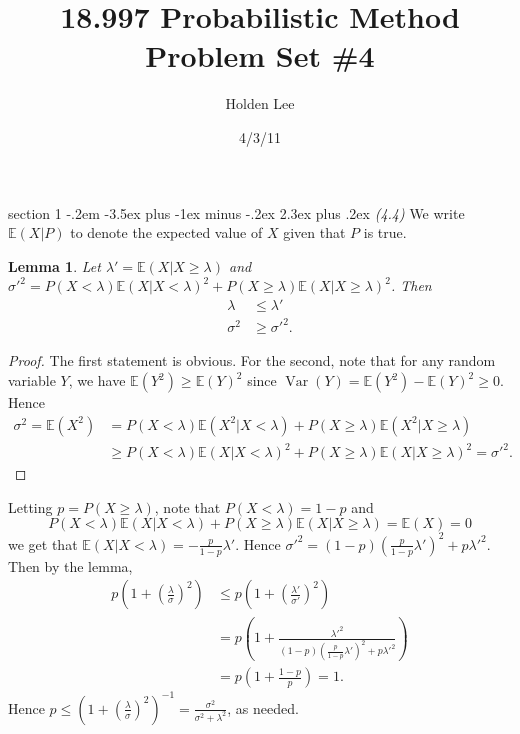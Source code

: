 \documentclass[12pt]{article}
\makeatletter
\theoremstyle{norm}
\newtheorem{lem}[thm]{Lemma}
\newcommand{\E}[0]{\mathbb{E}}
\newcommand{\la}[0]{\lambda}
\newcommand{\si}[0]{\sigma}
\newcommand{\pa}[1]{\left( {#1} \right)}
\newcommand{\Var}{\operatorname{Var}}
\newcommand{\pf}[2]{\pa{\frac{#1}{#2}}}
\newenvironment{problem}{\@startsection
       {section}
       {1}
       {-.2em}
       {-3.5ex plus -1ex minus -.2ex}
       {2.3ex plus .2ex}
       {\pagebreak[3]%
       \large\bf\noindent{Problem }
       }
       }
       {%
       }
\makeatother
\begin{document}
\title{18.997 Probabilistic Method Problem Set \#4}%
\author{Holden Lee}
\date{4/3/11}%
\maketitle
\thispagestyle{empty}

\begin{problem}{\it (4.4)}
We write $\E(X|P)$ to denote the expected value of $X$ given that $P$ is true. 
\begin{lem}
Let $\la'=\E(X|X\ge \la)$ and $\si'^2=P(X<\la)\E(X|X<\la)^2+P(X\ge \la)\E(X|X\ge \la)^2$. Then
\begin{align*}
\la&\le \la'\\
\si^2&\ge \si'^2.
\end{align*}
\end{lem}
\begin{proof}
The first statement is obvious. For the second, note that for any random variable $Y$, we have $\E(Y^2)\ge \E(Y)^2$ since $\Var(Y)=\E(Y^2)-\E(Y)^2\ge 0$. Hence
\begin{align*}
\si^2=\E(X^2)&= P(X<\la)\E(X^2|X<\la)+P(X\ge \la)\E(X^2|X\ge \la)\\
&\ge P(X<\la)\E(X|X<\la)^2+P(X\ge \la)\E(X|X\ge \la)^2=\si'^2.
\end{align*}
\end{proof}
Letting $p=P(X\ge \la)$, note that $P(X<\la)=1-p$ and
\[
P(X<\la)\E(X|X<\la)+P(X\ge \la)\E(X|X\ge \la)=\E(X)=0
\]
we get that $\E(X|X<\la)=-\frac{p}{1-p}\la'$. Hence $\si'^2=(1-p)\pa{\frac p{1-p}\la'}^2+p\la'^2$. Then by the lemma,
\begin{align*}
p\pa{1+\pf{\la}{\si}^2}&
\le p\pa{1+\pf{\la'}{\si'}^2}\\
&=p\pa{1+\frac{\la'^2}{(1-p)\pa{\frac p{1-p}\la'}^2+p\la'^2}}\\
&=p\pa{1+\frac{1-p}{p}}=1.
\end{align*}
Hence $p\le (1+(\frac{\la}{\si})^2)^{-1} =\frac{\si^2}{\si^2+\la^2}$, as needed.
\end{problem}
\end{document}
